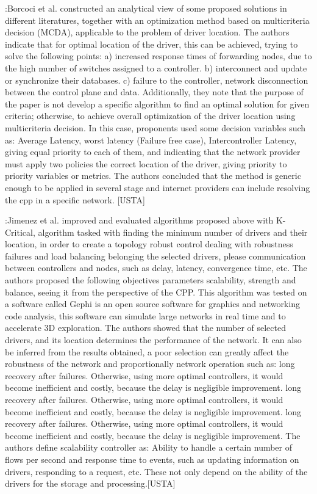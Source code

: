 \documentclass[a4paper,10pt]{article}
\begin{document}
\cite{VoBo15}:Borcoci et al. constructed an analytical view of some proposed solutions in different literatures, together with an optimization method based on multicriteria decision (MCDA), applicable to the problem of driver location. The authors indicate that for optimal location of the driver, this can be achieved, trying to solve the following points: a) increased response times of forwarding nodes, due to the high number of switches assigned to a controller. b) interconnect and update or synchronize their databases. c) failure to the controller, network disconnection between the control plane and data. Additionally, they note that the purpose of the paper is not develop a specific algorithm to find an optimal solution for given criteria; otherwise, to achieve overall optimization of the driver location using multicriteria decision. In this case, proponents used some decision variables such as: Average Latency, worst latency (Failure free case), Intercontroller Latency, giving equal priority to each of them, and indicating that the network provider must apply two policies the correct location of the driver, giving priority to priority variables or metrics. The authors concluded that the method is generic enough to be applied in several stage and internet providers can include resolving the cpp in a specific network. [USTA]



\cite{JiCe14}:Jimenez et al. improved and evaluated algorithms proposed above with K-Critical, algorithm tasked with finding the minimum number of drivers and their location, in order to create a topology robust control dealing with robustness failures and load balancing belonging the selected drivers, please communication between controllers and nodes, such as delay, latency, convergence time, etc. The authors proposed the following objectives parameters scalability, strength and balance, seeing it from the perspective of the CPP. This algorithm was tested on a software called Gephi is an open source software for graphics and networking code analysis, this software can simulate large networks in real time and to accelerate 3D exploration. The authors showed that the number of selected drivers, and its location determines the performance of the network. It can also be inferred from the results obtained, a poor selection can greatly affect the robustness of the network and proportionally network operation such as: long recovery after failures. Otherwise, using more optimal controllers, it would become inefficient and costly, because the delay is negligible improvement. long recovery after failures. Otherwise, using more optimal controllers, it would become inefficient and costly, because the delay is negligible improvement. long recovery after failures. Otherwise, using more optimal controllers, it would become inefficient and costly, because the delay is negligible improvement.
The authors define scalability controller as: Ability to handle a certain number of flows per second and response time to events, such as updating information on drivers, responding to a request, etc. These not only depend on the ability of the drivers for the storage and processing.[USTA]
\end{document}
